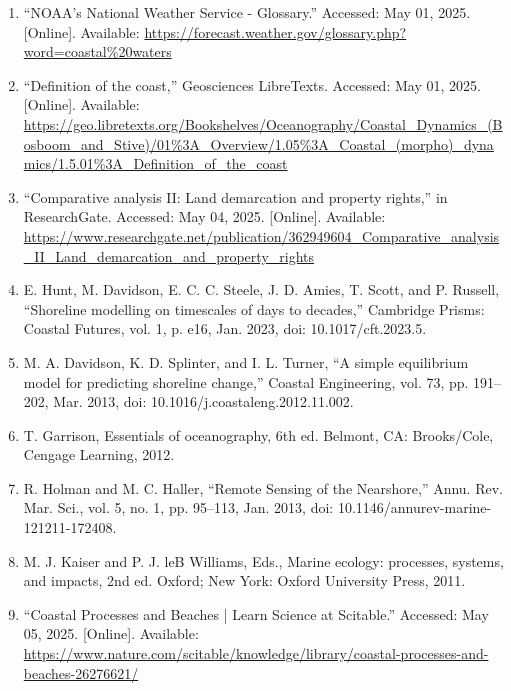 \documentclass{article}
\begin{document}
\begin{sloppypar}
\begin{enumerate}

    \item{“NOAA’s National Weather Service - Glossary.” Accessed: May 01, 2025. [Online]. Available: \url{https://forecast.weather.gov/glossary.php?word=coastal\%20waters}}
    
    \item{“Definition of the coast,” Geosciences LibreTexts. Accessed: May 01, 2025. [Online]. Available: \url{https://geo.libretexts.org/Bookshelves/Oceanography/Coastal_Dynamics_(Bosboom_and_Stive)/01%3A_Overview/1.05%3A_Coastal_(morpho)_dynamics/1.5.01%3A_Definition_of_the_coast}}
    
    \item{“Comparative analysis II: Land demarcation and property rights,” in ResearchGate. Accessed: May 04, 2025. [Online]. Available: \url{https://www.researchgate.net/publication/362949604_Comparative_analysis_II_Land_demarcation_and_property_rights}}
    
    \item{E. Hunt, M. Davidson, E. C. C. Steele, J. D. Amies, T. Scott, and P. Russell, “Shoreline modelling on timescales of days to decades,” Cambridge Prisms: Coastal Futures, vol. 1, p. e16, Jan. 2023, doi: 10.1017/cft.2023.5.}

    \item{M. A. Davidson, K. D. Splinter, and I. L. Turner, “A simple equilibrium model for predicting shoreline change,” Coastal Engineering, vol. 73, pp. 191–202, Mar. 2013, doi: 10.1016/j.coastaleng.2012.11.002.}

    \item{T. Garrison, Essentials of oceanography, 6th ed. Belmont, CA: Brooks/Cole, Cengage Learning, 2012.}

    \item{R. Holman and M. C. Haller, “Remote Sensing of the Nearshore,” Annu. Rev. Mar. Sci., vol. 5, no. 1, pp. 95–113, Jan. 2013, doi: 10.1146/annurev-marine-121211-172408.}

    \item{M. J. Kaiser and P. J. leB Williams, Eds., Marine ecology: processes, systems, and impacts, 2nd ed. Oxford; New York: Oxford University Press, 2011.}

    \item{“Coastal Processes and Beaches | Learn Science at Scitable.” Accessed: May 05, 2025. [Online]. Available: \url{https://www.nature.com/scitable/knowledge/library/coastal-processes-and-beaches-26276621/}}


\end{enumerate}
\end{sloppypar}
\end{document}
